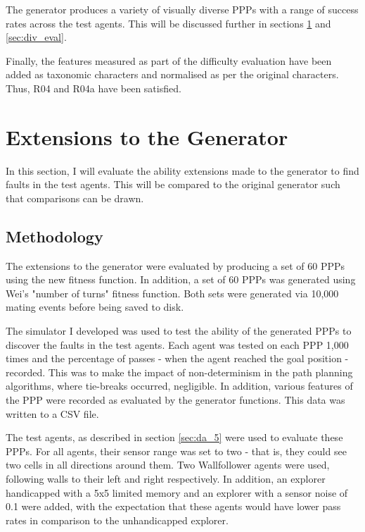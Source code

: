 \documentclass[authoryearcitations]{UoYCSproject}
\begin{document}
The generator produces a variety of visually diverse PPPs with a range of success rates across the test agents. This will be discussed further in sections \ref{sec:gen_eval} and \ref{sec:div_eval}.

Finally, the features measured as part of the difficulty evaluation have been added as taxonomic characters and normalised as per the original characters. Thus, R04 and R04a have been satisfied.

\section{Extensions to the Generator}
\label{sec:gen_eval}

In this section, I will evaluate the ability extensions made to the generator to find faults in the test agents. This will be compared to the original generator such that comparisons can be drawn.

\subsection{Methodology}
\label{sec:gen_eval_method}

The extensions to the generator were evaluated by producing a set of 60 PPPs using the new fitness function. In addition, a set of 60 PPPs was generated using Wei's "number of turns" fitness function. Both sets were generated via 10,000 mating events before being saved to disk.

The simulator I developed was used to test the ability of the generated PPPs to discover the faults in the test agents. Each agent was tested on each PPP 1,000 times and the percentage of passes - when the agent reached the goal position - recorded. This was to make the impact of non-determinism in the path planning algorithms, where tie-breaks occurred, negligible. In addition, various features of the PPP were recorded as evaluated by the generator functions. This data was written to a CSV file.

The test agents, as described in section \ref{sec:da_5} were used to evaluate these PPPs. For all agents, their sensor range was set to two - that is, they could see two cells in all directions around them. Two Wallfollower agents were used, following walls to their left and right respectively. In addition, an explorer handicapped with a 5x5 limited memory and an explorer with a sensor noise of 0.1 were added, with the expectation that these agents would have lower pass rates in comparison to the unhandicapped explorer.
\end{document}
